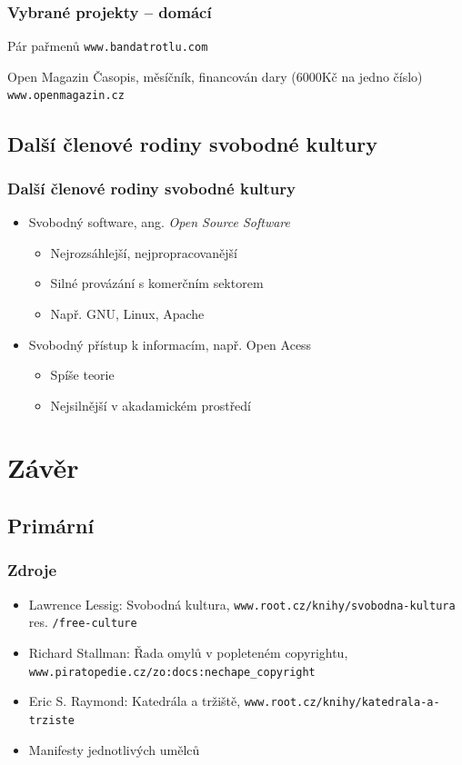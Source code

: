 \documentclass[xetex]{beamer}
\begin{document}
\begin{frame}
  \frametitle{Vybrané projekty -- domácí}
  \begin{block}{Pár pařmenů}
	\texttt{www.bandatrotlu.com}
  \end{block}

  \begin{block}{Open Magazin}
	Časopis, měsíčník, financován dary (6000Kč na jedno číslo)
	\texttt{www.openmagazin.cz}
  \end{block}
\end{frame}
\subsection{Další členové rodiny svobodné kultury}
\begin{frame}
  \frametitle{Další členové rodiny svobodné kultury}
  \begin{itemize}
	\item Svobodný software, ang. \emph{Open Source Software}
		\begin{itemize}
			\item Nejrozsáhlejší, nejpropracovanější
			\item Silné provázání s komerčním sektorem
			\item Např. GNU, Linux, Apache
		\end{itemize}
	\bigskip
	\item Svobodný přístup k informacím, např. Open Acess
		\begin{itemize}
			\item Spíše teorie
			\item Nejsilnější v akadamickém prostředí
		\end{itemize}
  \end{itemize}
\end{frame}

\section{Závěr}
\subsection{Primární}
\begin{frame}
  \frametitle{Zdroje}
  \begin{itemize}
	\item Lawrence Lessig: Svobodná kultura, \texttt{www.root.cz/knihy/svobodna-kultura} res. \texttt{/free-culture}
	\item Richard Stallman: Řada omylů v popleteném copyrightu, 
		\texttt{www.piratopedie.cz/zo:docs:nechape\_copyright}
	\item Eric S. Raymond: Katedrála a tržiště, \texttt{www.root.cz/knihy/katedrala-a-trziste}	
	\item Manifesty jednotlivých umělců
  \end{itemize}
\end{frame}
\end{document}
